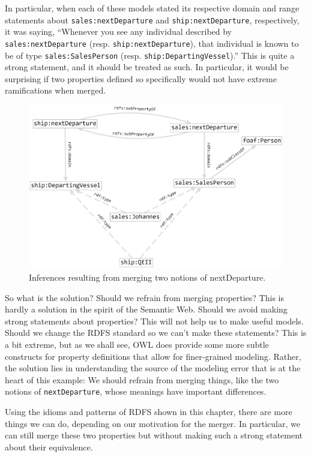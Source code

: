 In particular, when each of these models stated its respective domain
and range statements about \texttt{sales:nextDeparture} and \texttt{ship:nextDeparture},
respectively, it was saying, ``Whenever you see any individual described
by \texttt{sales:nextDeparture} (resp. \texttt{ship:nextDeparture}), that individual is
known to be of type \texttt{sales:SalesPerson} (resp. \texttt{ship:DepartingVessel}).''
This is quite a strong statement, and it should be treated as such. In
particular, it would be surprising if two properties defined so
specifically would not have extreme ramifications when merged.

\begin{figure}
\centering
\includegraphics[width=5in]{SWWOv3/media/ch8/figure8-6.png}
\caption{Inferences resulting from merging two notions of nextDeparture.}
\label{fig:ch8.6}
\end{figure}



So what is the solution? Should we refrain from merging properties? This
is hardly a solution in the spirit of the Semantic Web. Should we avoid
making strong statements about properties? This will not help us to make
useful models. Should we change the RDFS standard so we can't make these
statements? This is a bit extreme, but as we shall see, OWL does provide
some more subtle constructs for property definitions that allow for
finer-grained modeling. Rather, the solution lies in understanding the
source of the modeling error that is at the heart of this example: We
should refrain from merging things, like the two notions of
\texttt{nextDeparture}, whose meanings have important differences.

Using the idioms and patterns of RDFS shown in this chapter, there are
more things we can do, depending on our motivation for the merger. In
particular, we can still merge these two properties but without making
such a strong statement about their equivalence.

